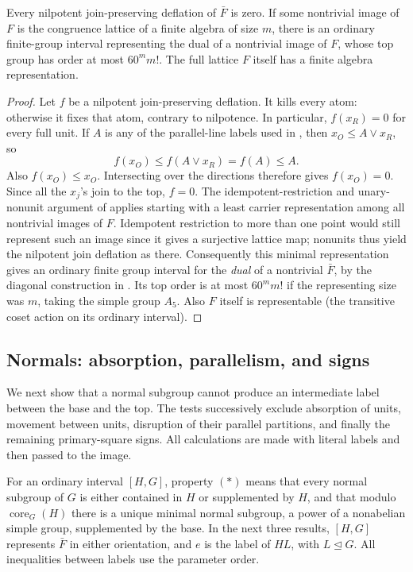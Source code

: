 \begin{proposition}\label{t:weighted-algebra}
Every nilpotent join-preserving deflation of \(\bar F\) is zero.
If some nontrivial image of \(F\) is the congruence lattice of a finite algebra
of size \(m\), there is an ordinary finite-group interval representing the
dual of a nontrivial image of \(F\), whose top group has order at most
\(60^m m!\).  The full lattice \(F\) itself has a finite algebra representation.
\end{proposition}
\begin{proof}
Let \(f\) be a nilpotent join-preserving deflation.  It kills every atom:
otherwise it fixes that atom, contrary to nilpotence.  In particular,
\(f(x_R)=0\) for every full unit.  If \(A\) is any of the parallel-line
labels used in , then \(x_O\le A\vee x_R\), so
\[
 f(x_O)\le f(A\vee x_R)=f(A)\le A.
\]
Also \(f(x_O)\le x_O\).  Intersecting over the directions therefore gives
\(f(x_O)=0\).  Since all the \(x_j\)'s join to the top, \(f=0\).
The idempotent-restriction and unary-nonunit argument of
 applies starting with a least carrier representation
among all nontrivial images of \(F\). Idempotent restriction to more than one point would still
represent such an image since it gives a surjective lattice map; nonunits thus yield the nilpotent
join deflation as there. Consequently this minimal representation gives an ordinary finite group
interval for the \emph{dual} of a nontrivial \(\bar F\), by the diagonal construction in . Its top order is at most \(60^m m!\) if the representing size was \(m\), taking
the simple group \(A_5\). Also \(F\) itself is representable (the transitive coset action on its
ordinary interval).
\end{proof}

\subsection{Normals: absorption, parallelism, and signs}

We next show that a normal subgroup cannot produce an intermediate label
between the base and the top.  The tests successively exclude absorption
of units, movement between units, disruption of their parallel partitions,
and finally the remaining primary-square signs.  All calculations are
made with literal labels and then passed to the image.

\begin{convention}\label{t:weighted-normal-convention}
For an ordinary interval \([H,G]\), property \((*)\) means that every normal
subgroup of \(G\) is either contained in \(H\) or supplemented by \(H\),
and that modulo \(\operatorname{core}_G(H)\) there is a unique minimal normal
subgroup, a power of a nonabelian simple group, supplemented by the base.
In the next three results, \([H,G]\) represents \(\bar F\) in either orientation,
and \(e\) is the label of \(HL\), with \(L\trianglelefteq G\).
All inequalities between labels use the parameter order.
\end{convention}

